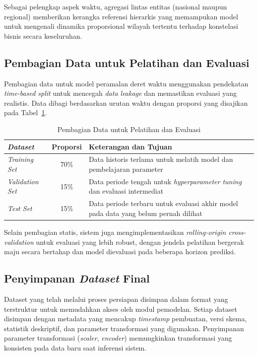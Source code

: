 Sebagai pelengkap aspek waktu, agregasi lintas entitas (nasional maupun regional) memberikan kerangka referensi hierarkis yang memampukan model untuk mengenali dinamika proporsional wilayah tertentu terhadap konstelasi bisnis secara keseluruhan.

\subsection{Pembagian Data untuk Pelatihan dan Evaluasi}
\label{subsec:split-data}

Pembagian data untuk model peramalan deret waktu menggunakan pendekatan \textit{time-based split} untuk mencegah \textit{data leakage} dan memastikan evaluasi yang realistis. Data dibagi berdasarkan urutan waktu dengan proporsi yang disajikan pada Tabel~\ref{tab:split-data}.

\begin{table}[htbp]
\centering
\caption{Pembagian Data untuk Pelatihan dan Evaluasi}
\label{tab:split-data}
\begin{tabular}{|p{3.5cm}|c|p{7.5cm}|}
\hline
\textbf{\textit{Dataset}} & \textbf{Proporsi} & \textbf{Keterangan dan Tujuan} \\
\hline
\textit{\textit{Training Set}} & 70\% & Data historis terlama untuk melatih model dan pembelajaran parameter \\
\hline
\textit{\textit{Validation Set}} & 15\% & Data periode tengah untuk \textit{hyperparameter tuning} dan evaluasi intermediat \\
\hline
\textit{\textit{Test Set}} & 15\% & Data periode terbaru untuk evaluasi akhir model pada data yang belum pernah dilihat \\
\hline
\end{tabular}
\end{table}

Selain pembagian statis, sistem juga mengimplementasikan \textit{rolling-origin cross-validation} untuk evaluasi yang lebih robust, dengan jendela pelatihan bergerak maju secara bertahap dan model dievaluasi pada beberapa horizon prediksi.

\subsection{Penyimpanan \textit{Dataset} Final}
\label{subsec:penyimpanan-dataset}

Dataset yang telah melalui proses persiapan disimpan dalam format yang terstruktur untuk memudahkan akses oleh modul pemodelan. Setiap dataset disimpan dengan metadata yang mencakup \textit{timestamp} pembuatan, versi skema, statistik deskriptif, dan parameter transformasi yang digunakan. Penyimpanan parameter transformasi (\textit{scaler}, \textit{encoder}) memungkinkan transformasi yang konsisten pada data baru saat inferensi sistem.


